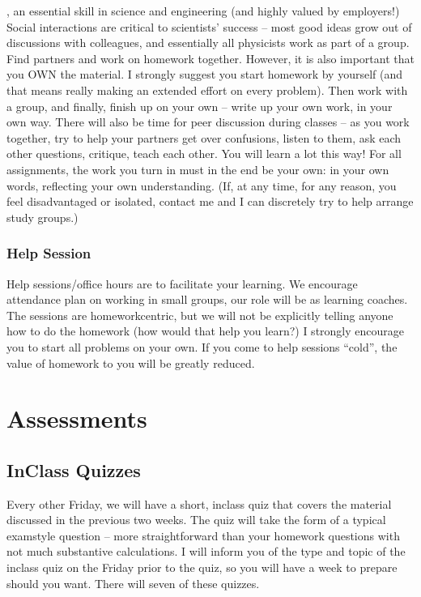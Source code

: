 \documentclass[letterpaper,10pt,english]{jupyterBook}
\begin{document}
\sphinxAtStartPar
{}, an essential skill in science and engineering (and highly valued by employers!) Social interactions are critical to scientists’ success – most good ideas grow out of discussions with colleagues, and essentially all physicists work as part of a group. Find partners and work on homework together. However, it is also important that you OWN the material. I strongly suggest you start homework by yourself (and that means really making an extended effort on every problem). Then work with a group, and finally, finish up on your own – write up your own work, in your own way. There will also be time for peer discussion during classes – as you work together, try to help your partners get over confusions, listen to them, ask each other questions, critique, teach each other. You will learn a lot this way! For all assignments, the work you turn in must in the end be your own: in your own words, reflecting your own understanding. (If, at any time, for any reason, you feel disadvantaged or isolated, contact me and I can discretely try to help arrange study groups.)


\subsubsection{Help Session}
\label{\detokenize{content/0_course/design:help-session}}
\sphinxAtStartPar
Help sessions/office hours are to facilitate your learning. We encourage attendance \sphinxhyphen{} plan on working in small groups, our role will be as learning coaches. The sessions are homework\sphinxhyphen{}centric, but we will not be explicitly telling anyone how to do the homework (how would that help you learn?) I strongly encourage you to start all problems on your own. If you come to help sessions “cold”, the value of homework to you will be greatly reduced.


\section{Assessments}
\label{\detokenize{content/0_course/assessments:assessments}}\label{\detokenize{content/0_course/assessments::doc}}

\subsection{In\sphinxhyphen{}Class Quizzes}
\label{\detokenize{content/0_course/assessments:in-class-quizzes}}
\sphinxAtStartPar
Every other Friday, we will have a short, in\sphinxhyphen{}class quiz that covers the material discussed in the previous two weeks. The quiz will take the form of a typical exam\sphinxhyphen{}style question – more straight\sphinxhyphen{}forward than your homework questions with not much substantive calculations. I will inform you of the type and topic of the in\sphinxhyphen{}class quiz on the Friday prior to the quiz, so you will have a week to prepare should you want. There will seven of these quizzes. 
\end{document}
